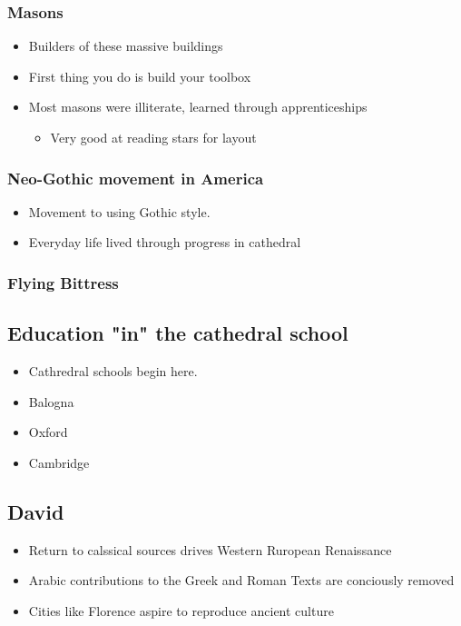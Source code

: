\documentclass[11pt]{article}
\begin{document}
\subsubsection{Masons}
\label{sec-9-3-1}
\begin{itemize}
\item Builders of these massive buildings
\item First thing you do is build your toolbox
\item Most masons were illiterate, learned through apprenticeships
\begin{itemize}
\item Very good at reading stars for layout
\end{itemize}
\end{itemize}
\subsubsection{Neo-Gothic movement in America}
\label{sec-9-3-2}
\begin{itemize}
\item Movement to using Gothic style.
\item Everyday life lived through progress in cathedral
\end{itemize}
\subsubsection{Flying Bittress}
\label{sec-9-3-3}

\subsection{Education "in" the cathedral school}
\label{sec-9-4}
\begin{itemize}
\item Cathredral schools begin here.
\item Balogna
\item Oxford
\item Cambridge
\end{itemize}


\subsection{David}
\label{sec-9-5}
\begin{itemize}
\item Return to calssical sources drives Western Ruropean Renaissance
\item Arabic contributions to the Greek and Roman Texts are conciously removed
\item Cities like Florence aspire to reproduce ancient culture
\end{itemize}
\end{document}
